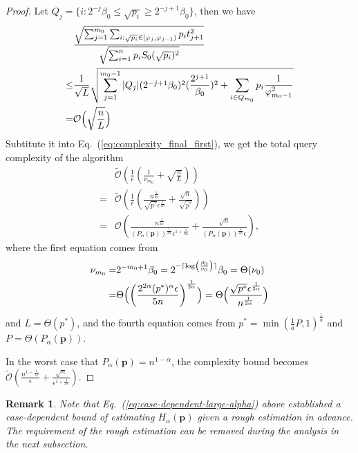 \documentclass[journal]{IEEEtran}
\newtheorem{remark}{Remark}
\newcommand{\eq}[1]{Eq.~(\ref{eq:#1})}
\begin{document}
\begin{proof}
Let $Q_j= \{i: 2^{-j}\beta_0 \le \sqrt{p_i} \ge 2^{-j+1}\beta_0\}$, then we have 
\begin{align}
  \label{eq:averge_query_complexity}
  &\frac{\sqrt{\sum_{j = 1}^{m_0}\sum_{i:\sqrt{p_i}\in[\varphi_{j},\varphi_{j-1})}p_i t_{j+1}^2}}{\sqrt{\sum_{i = 1}^np_iS_0(\sqrt{p_i})^2}}\nonumber\\
  \le&\frac{1}{\sqrt{L}}\sqrt{\sum_{j=1}^{m_0-1}|Q_j|(2^{-j+1}\beta_0)^2(\frac{2^{j+1}}{\beta_0})^2 + \sum_{i\in Q_{m_{0}}}p_i\frac{1}{\varphi_{m_0-1}^2}} \nonumber\\
  = &\mathcal{O}\Bigl(\sqrt{\frac{n}{L}}\Bigr)
\end{align}
Subtitute it into \eq{complexity_final_first}, we get the total query complexity of the algorithm
\begin{align}
  &\widetilde{\mathcal{O}}\left(\frac{1}{\epsilon}\left(\frac{1}{\nu_{m_0}} + \sqrt{\frac{n}{L}}\right)\right) \nonumber\\
  =&\widetilde{\mathcal{O}}\left(\frac{1}{\epsilon}\left(\frac{n^{\frac{1}{2\alpha}}}{\sqrt{p^*}\epsilon^{\frac{1}{2\alpha}}} + \frac{\sqrt{n}}{\sqrt{p^*}}\right)\right) \nonumber\\
  =&\mathcal{O}\left(\frac{n^{\frac{1}{2\alpha}}}{(P_{\alpha}(\mathbf{p}))^{\frac{1}{2\alpha}}\epsilon^{1+\frac{1}{2\alpha}}}+\frac{\sqrt{n}}{(P_{\alpha}(\mathbf{p}))^{\frac{1}{2\alpha}}\epsilon}\right), \label{eq:case-dependent-large-alpha}
\end{align}
where the first equation comes from
\begin{align}\label{eq:nu-m-0}
\nu_{m_0} = &2^{-m_0+1}\beta_0 = 2^{-\lceil \log(\frac{\beta_0}{\nu_0})\rceil}\beta_0 = \Theta(\nu_0) \nonumber \\
= & \Theta\Bigl(\left(\frac{2^{2\alpha}(p^*)^{\alpha}\epsilon}{5n}\right)^{\frac{1}{2\alpha}}\Bigr) = \Theta\Bigl(\frac{\sqrt{p^*} \epsilon^{\frac{1}{2\alpha}}}{n^{\frac{1}{2\alpha}}}\Bigr)
\end{align}
and $L = \Theta(p^*)$, and the fourth equation comes from $p^* = \min(\frac{1}{a}P,1)^{\frac{1}{\alpha}}$ and $P = \Theta(P_{\alpha}(\mathbf{p}))$.

In the worst case that $P_{\alpha}(\mathbf{p}) = n^{1-\alpha}$, the complexity bound becomes $ \widetilde{\mathcal{O}}\left(\frac{n^{1-\frac{1}{2\alpha}}}{\epsilon} + \frac{\sqrt{n}}{\epsilon^{1+\frac{1}{2\alpha}}}\right)$.
\end{proof}

\begin{remark}
Note that \eq{case-dependent-large-alpha} above established a case-dependent bound of estimating $H_{\alpha}(\mathbf{p})$ given a rough estimation in advance. The requirement of the rough estimation can be removed during the analysis in the next subsection. 
\end{remark}
\end{document}
